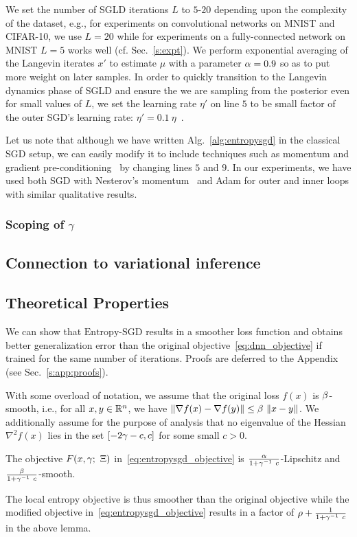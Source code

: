 \documentclass[10pt]{article}
\newcommand{\entropysgd}{\mathrm{Entropy}\textrm{-}\mathrm{SGD}}
\newcommand{\pc}[2]{{\color{ForestGreen}#1}\marginpar{\tiny\noindent{\raggedright{\color{Sienna}[PC]}\color{Sienna}{#2} \par}}}
\newcommand{\todo}[1]{{\color{gray}#1}\marginpar{\tiny\noindent{\raggedright{\color{blue}[TODO]}}}}
\begin{document}
\todo{
We set the number of SGLD iterations $L$ to $5$-$20$ depending upon the complexity of the dataset, e.g., for experiments on convolutional networks on MNIST and CIFAR-10, we use $L = 20$ while for experiments on a fully-connected network on MNIST $L=5$ works well (cf. Sec.~\ref{s:expt}). We perform exponential averaging of the Langevin iterates $x'$ to estimate $\mu$ with a parameter $\alpha = 0.9$ so as to put more weight on later samples. In order to quickly transition to the Langevin dynamics phase of SGLD and ensure the we are sampling from the posterior even for small values of $L$, we set the learning rate $\eta'$ on line $5$ to be small factor of the outer SGD's learning rate: $\eta' = 0.1\ \eta$~\citep{welling2011bayesian}.}

Let us note that although we have written Alg.~\ref{alg:entropysgd} in the classical SGD setup, we can easily modify it to include techniques such as momentum and gradient pre-conditioning~\citep{duchi2011adaptive} by changing lines $5$ and $9$. In our experiments, we have used both SGD with Nesterov's momentum~\citep{sutskever2013importance} and Adam for outer and inner loops with similar qualitative results.

\subsubsection{Scoping of $\gamma$}

\subsection{Connection to variational inference}
\label{ss:connection_variational}


\subsection{Theoretical Properties}
\label{ss:theoretical_properties}

\pc{We can show that $\entropysgd$ results in a smoother loss function and obtains better generalization error than the original objective~\eqref{eq:dnn_objective} if trained for the same number of iterations. Proofs are deferred to the Appendix (see Sec.~\ref{s:app:proofs}).}{Clarify that the analysis here is only a sketch, it is not rigorous}

With some overload of notation, we assume that the original loss $f(x)$ is $\beta$-smooth, i.e., for all $x,y \in \mathbb{R}^n$, we have $\norm{\nabla f(x) - \nabla f(y)} \leq \b\ \norm{x-y}$. We additionally assume for the purpose of analysis that no eigenvalue of the Hessian $\nabla^2 f(x)$ lies in the set $[-2 \gamma-c, c]$ for some small $c > 0$.
%
\begin{lemma}
\label{lem:smoothness_reduction}
The objective $F(x, \gamma;\ \Xi)$ in~\eqref{eq:entropysgd_objective} is $\frac{\alpha}{1 + \gamma^{-1}\ c}$-Lipschitz and $\f{\b}{1 + \g^{-1}\ c}$-smooth.
\end{lemma}
The local entropy objective is thus smoother than the original objective while the modified objective in~\eqref{eq:entropysgd_objective} results in a factor of $\rho + \frac{1}{1 + \gamma^{-1}\ c}$ in the above lemma.
\end{document}

